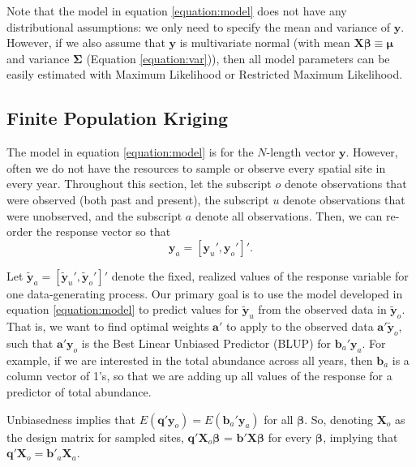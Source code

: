 \documentclass[]{interact}
\theoremstyle{plain}%
\theoremstyle{definition}
\theoremstyle{remark}
\begin{document}
Note that the model in equation \ref{equation:model} does not have any
distributional assumptions: we only need to specify the mean and
variance of \(\mathbf{y}\). However, if we also assume that
\(\mathbf{y}\) is multivariate normal (with mean
\(\mathbf{X} \bm{\beta} \equiv \bm{\mu}\) and variance \(\bm{\Sigma}\)
(Equation \ref{equation:var})), then all model parameters can be easily
estimated with Maximum Likelihood or Restricted Maximum Likelihood.

\subsection{Finite Population Kriging}

The model in equation \ref{equation:model} is for the \(N\)-length
vector \(\mathbf{y}\). However, often we do not have the resources to
sample or observe every spatial site in every year. Throughout this
section, let the subscript \(o\) denote observations that were observed
(both past and present), the subscript \(u\) denote observations that
were unobserved, and the subscript \(a\) denote all observations. Then,
we can re-order the response vector so that \mbox{} \begin{equation}
\mathbf{y}_a = [\mathbf{y}_u', \mathbf{y}_o']'.
\end{equation}

Let
\(\mathbf{\tilde{y}}_a = [\mathbf{\tilde{y}}_u', \mathbf{\tilde{y}}_o']'\)
denote the fixed, realized values of the response variable for one
data-generating process. Our primary goal is to use the model developed
in equation \ref{equation:model} to predict values for
\(\mathbf{\tilde{y}}_{u}\) from the observed data in
\(\mathbf{\tilde{y}}_{o}\). That is, we want to find optimal weights
\(\mathbf{a}'\) to apply to the observed data
\(\mathbf{a}' \mathbf{\tilde{y}}_o\), such that
\(\mathbf{a}' \mathbf{y}_o\) is the Best Linear Unbiased Predictor
(BLUP) for \(\mathbf{b}_a' \mathbf{y}_a\). For example, if we are
interested in the total abundance across all years, then
\(\mathbf{b}_a\) is a column vector of 1's, so that we are adding up all
values of the response for a predictor of total abundance.

Unbiasedness implies that
\(E(\mathbf{q'}\mathbf{y}_o) = E(\mathbf{b}_a'\mathbf{y}_a)\) for all
\(\bm{\beta}\). So, denoting \(\mathbf{X}_o\) as the design matrix for
sampled sites, \(\mathbf{q'} \mathbf{X}_o \bm{\beta}\) =
\(\mathbf{b'} \mathbf{X} \bm{\beta}\) for every \(\bm{\beta}\), implying
that \(\mathbf{q'} \mathbf{X}_o = \mathbf{b'}_a \mathbf{X}_a\).
\end{document}
